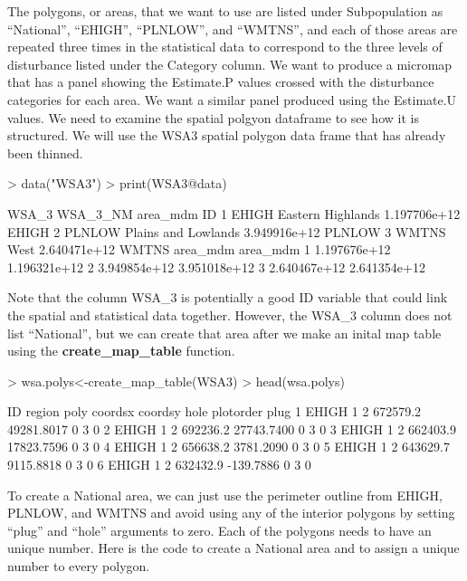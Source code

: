 \documentclass{article}
\begin{document}
The polygons, or areas, that we want to use are listed under Subpopulation as ``National'', ``EHIGH'', ``PLNLOW'', and ``WMTNS'', and each of those areas are repeated three times in the statistical data to correspond to the three levels of disturbance listed under the Category column.  We want to produce a micromap that has a panel showing the Estimate.P values crossed with the disturbance categories for each area.  We want a similar panel produced using the Estimate.U values.
We need to examine the spatial polgyon dataframe to see how it is structured.  We will use the WSA3 spatial polygon data frame that has already been thinned.
\begin{Schunk}
\begin{Sinput}
> data("WSA3")
> print(WSA3@data)
\end{Sinput}
\begin{Soutput}
   WSA_3            WSA_3_NM     area_mdm     ID
1  EHIGH   Eastern Highlands 1.197706e+12  EHIGH
2 PLNLOW Plains and Lowlands 3.949916e+12 PLNLOW
3  WMTNS                West 2.640471e+12  WMTNS
      area_mdm     area_mdm
1 1.197676e+12 1.196321e+12
2 3.949854e+12 3.951018e+12
3 2.640467e+12 2.641354e+12
\end{Soutput}
\end{Schunk}
Note that the column WSA\_3 is potentially a good ID variable that could link the spatial and statistical data together.  However, the WSA\_3 column does not list ``National'', but we can create that area after we make an inital map table using the \textbf{create\_map\_table} function.
\begin{Schunk}
\begin{Sinput}
> wsa.polys<-create_map_table(WSA3)
> head(wsa.polys)
\end{Sinput}
\begin{Soutput}
     ID region poly  coordsx    coordsy hole plotorder plug
1 EHIGH      1    2 672579.2 49281.8017    0         3    0
2 EHIGH      1    2 692236.2 27743.7400    0         3    0
3 EHIGH      1    2 662403.9 17823.7596    0         3    0
4 EHIGH      1    2 656638.2  3781.2090    0         3    0
5 EHIGH      1    2 643629.7  9115.8818    0         3    0
6 EHIGH      1    2 632432.9  -139.7886    0         3    0
\end{Soutput}
\end{Schunk}
To create a National area, we can just use the perimeter outline from EHIGH, PLNLOW, and WMTNS and avoid using any of the interior polygons by setting ``plug'' and ``hole'' arguments to zero.  Each of the polygons needs to have an unique number.  Here is the code to create a National area and to assign a unique number to every polygon.
\end{document}
